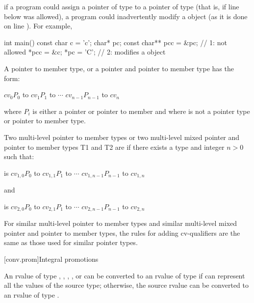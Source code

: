 \enternote 
if a program could assign a pointer of type  to a pointer of
type   (that is, if line  below was
allowed), a program could inadvertently modify a  object
(as it is done on line ). For example,

\begin{codeblock}
int main() {
	const char c = 'c';
	char* pc;
	const char** pcc = &pc;		// 1: not allowed
	*pcc = &c;
	*pc = 'C';              // 2: modifies a  object
}
\end{codeblock}
\exitnoteb


\pnum
{}%
%
A  pointer to member type, or a
 pointer and pointer to member type has the
form:

\begin{indented}
$\mathit{cv}_0 P_0$ to $\mathit{cv}_1P_1$ to $\cdots$ $\mathit{cv}_{n-1}P_{n-1}$
to $\mathit{cv}_n$ 
\end{indented}

where $P_i$ is either a pointer or pointer to member and where 
is not a pointer type or pointer to member type.

\pnum
Two multi-level pointer to member types or two multi-level mixed pointer
and pointer to member types T1 and T2 are  if there
exists a type  and integer $n > 0$ such that:

\begin{indented}
 is $\mathit{cv}_{1,0}P_0$ to $\mathit{cv}_{1,1}P_1$
to $\cdots$ $\mathit{cv}_{1,n-1}P_{n-1}$ to $\mathit{cv}_{1,n}$ 
\end{indented}

and

\begin{indented}
 is $\mathit{cv}_{2,0}P_0$ to $\mathit{cv}_{2,1}P_1$
to $\cdots$ $\mathit{cv}_{2,n-1}P_{n-1}$ to $\mathit{cv}_{2,n}$ 
\end{indented}

\pnum
For similar multi-level pointer to member types and similar multi-level
mixed pointer and pointer to member types, the rules for adding
cv-qualifiers are the same as those used for similar pointer types.%

[conv.prom]{Integral promotions}

\pnum
{}%
An rvalue of type , , ,
, or  can be
converted to an rvalue of type  if  can represent
all the values of the source type; otherwise, the source rvalue can be
converted to an rvalue of type .

